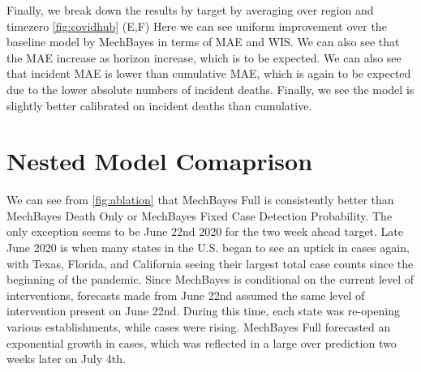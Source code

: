 \documentclass[11pt]{amsart}
\begin{document}
Finally, we break down the results by target by averaging over region and timezero  \ref{fig:covidhub} (E,F) Here we can see uniform improvement over the baseline model by MechBayes in terms of MAE and WIS. We can also see that the MAE increase as horizon increase, which is to be expected. We can also see that incident MAE is lower than cumulative MAE, which is again to be expected due to the lower absolute numbers of incident deaths. Finally, we see the model is slightly better calibrated on incident deaths than cumulative.
%
%   
   
   
   \section{Nested Model Comaprison}

We can see from \ref{fig:ablation} that MechBayes Full is consistently better than MechBayes Death Only or MechBayes Fixed Case Detection Probability. The only exception seems to be June 22nd 2020 for the two week ahead target. Late June 2020 is when many states in the U.S. began to see an uptick in cases again, with Texas, Florida, and California seeing their largest total case counts since the beginning of the pandemic. Since MechBayes is conditional on the current level of interventions, forecasts made from June 22nd assumed the same level of intervention present on June 22nd. During this time, each state was re-opening various establishments, while cases were rising. MechBayes Full forecasted an exponential growth in cases, which was reflected in a large over prediction two weeks later on July 4th. 
\end{document}
